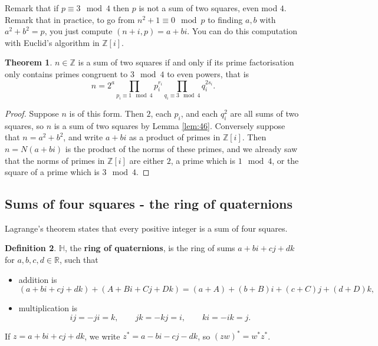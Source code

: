 \documentclass{article}
\newcommand{\Z}{\mathbb{Z}}
\newcommand{\R}{\mathbb{R}}
\renewcommand{\H}{\mathbb{H}}
\newcommand{\rb}[1]{\left( #1 \right)}
\renewcommand{\sb}[1]{\left[ #1 \right]}
\theoremstyle{definition}\newtheorem{definition}{Definition}
\theoremstyle{definition}\newtheorem{remark}[definition]{Remark}
\theoremstyle{definition}\newtheorem*{example}{Example}
\theoremstyle{definition}\newtheorem*{note}{Note}
\newtheorem{theorem}[definition]{Theorem}
\begin{document}
Remark that if $ p \equiv 3 \mod 4 $ then $ p $ is not a sum of two squares, even mod $ 4 $. Remark that in practice, to go from $ n^2 + 1 \equiv 0 \mod p $ to finding $ a, b $ with $ a^2 + b^2 = p $, you just compute $ \rb{n + i, p} = a + bi $. You can do this computation with Euclid's algorithm in $ \Z\sb{i} $.

\begin{theorem}
$ n \in \Z $ is a sum of two squares if and only if its prime factorisation only contains primes congruent to $ 3 \mod 4 $ to even powers, that is
$$ n = 2^a\prod_{p_i \equiv 1 \mod 4} p_i^{r_i}\prod_{q_i \equiv 3 \mod 4} q_i^{2s_i}. $$
\end{theorem}

\begin{proof}
Suppose $ n $ is of this form. Then $ 2 $, each $ p_i $, and each $ q_i^2 $ are all sums of two squares, so $ n $ is a sum of two squares by Lemma \ref{lem:46}. Conversely suppose that $ n = a^2 + b^2 $, and write $ a + bi $ as a product of primes in $ \Z\sb{i} $. Then $ n = N\rb{a + bi} $ is the product of the norms of these primes, and we already saw that the norms of primes in $ \Z\sb{i} $ are either $ 2 $, a prime which is $ 1 \mod 4 $, or the square of a prime which is $ 3 \mod 4 $.
\end{proof}

\subsection{Sums of four squares - the ring of quaternions}

Lagrange's theorem states that every positive integer is a sum of four squares.

\begin{definition}
$ \H $, the \textbf{ring of quaternions}, is the ring of sums $ a + bi + cj + dk $ for $ a, b, c, d \in \R $, such that
\begin{itemize}
\item addition is
$$ \rb{a + bi + cj + dk} + \rb{A + Bi + Cj + Dk} = \rb{a + A} + \rb{b + B}i + \rb{c + C}j + \rb{d + D}k, $$
\item multiplication is
$$ ij = -ji = k, \qquad jk = -kj = i, \qquad ki = -ik = j. $$
\end{itemize}
If $ z = a + bi + cj + dk $, we write $ z^* = a - bi - cj - dk $, so $ \rb{zw}^* = w^*z^* $.
\end{definition}
\end{document}

